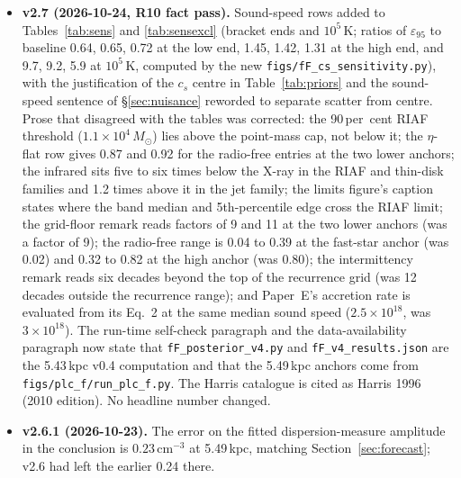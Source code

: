 \documentclass[11pt]{article}
\newcommand{\msun}{\ensuremath{M_\odot}}
\newcommand{\epsl}{\ensuremath{\varepsilon_{95}}}
\begin{document}
\begin{itemize}
A third pass (farm D359) brings the header comment and this entry into agreement and clears the one construction that stopped the file from building. The comment block's parenthetical reads as this entry's heading does. The citation attached to the Bondi eigenvalue in Eq.~\ref{eq:bondi} is set in text mode, which is what TeX Live 2023 accepts inside a display; no number, table entry or figure coordinate changed. The decade-down prior shift of \S\ref{sec:sensitivity} prints 0.27 because the unrounded exclusion fractions give 0.273575, against the 0.28 that subtracting the two printed cells of Table~\ref{tab:sensexcl} would give.
\item \textbf{v2.7 (2026-10-24, R10 fact pass).} Sound-speed rows added to Tables~\ref{tab:sens} and \ref{tab:sensexcl} (bracket ends and $10^{5}$\,K; ratios of \epsl{} to baseline 0.64, 0.65, 0.72 at the low end, 1.45, 1.42, 1.31 at the high end, and 9.7, 9.2, 5.9 at $10^{5}$\,K, computed by the new \texttt{figs/fF\_cs\_sensitivity.py}), with the justification of the $c_{s}$ centre in Table~\ref{tab:priors} and the sound-speed sentence of \S\ref{sec:nuisance} reworded to separate scatter from centre. Prose that disagreed with the tables was corrected: the 90\,per~cent RIAF threshold ($1.1\times10^{4}\,\msun$) lies above the point-mass cap, not below it; the $\eta$-flat row gives 0.87 and 0.92 for the radio-free entries at the two lower anchors; the infrared sits five to six times below the X-ray in the RIAF and thin-disk families and 1.2 times above it in the jet family; the limits figure's caption states where the band median and 5th-percentile edge cross the RIAF limit; the grid-floor remark reads factors of 9 and 11 at the two lower anchors (was a factor of 9); the radio-free range is 0.04 to 0.39 at the fast-star anchor (was 0.02) and 0.32 to 0.82 at the high anchor (was 0.80); the intermittency remark reads six decades beyond the top of the recurrence grid (was 12 decades outside the recurrence range); and Paper~E's accretion rate is evaluated from its Eq.~2 at the same median sound speed ($2.5\times10^{18}$, was $3\times10^{18}$). The run-time self-check paragraph and the data-availability paragraph now state that \texttt{fF\_posterior\_v4.py} and \texttt{fF\_v4\_results.json} are the 5.43\,kpc v0.4 computation and that the 5.49\,kpc anchors come from \texttt{figs/plc\_f/run\_plc\_f.py}. The Harris catalogue is cited as Harris 1996 (2010 edition). No headline number changed.
\item \textbf{v2.6.1 (2026-10-23).} The error on the fitted dispersion-measure amplitude in the conclusion is $0.23\,\mathrm{cm^{-3}}$ at 5.49\,kpc, matching Section~\ref{sec:forecast}; v2.6 had left the earlier 0.24 there.

\end{itemize}
\end{document}
